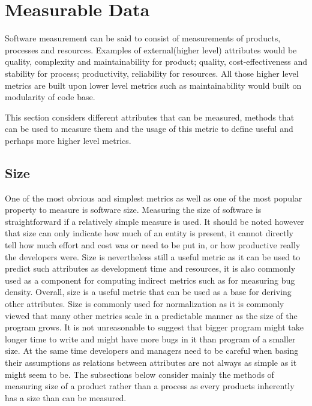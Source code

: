 \documentclass[11pt]{article}
\begin{document}
\section{Measurable Data}
\label{sec:Methods}
Software measurement can be said to consist of measurements of products, processes and resources.\cite{Fenton:2014:SMR:2700539} Examples of external(higher level) attributes would be quality, complexity and maintainability for product; quality, cost-effectiveness and stability for process; productivity, reliability for resources. All those higher level metrics are built upon lower level metrics such as maintainability would built on modularity of code base.

This section considers different attributes that can be measured, methods that can be used to measure them and the usage of this metric to define useful and perhaps more higher level metrics.

\subsection{Size}
One of the most obvious and simplest metrics as well as one of the most popular property to measure is software size. Measuring the size of software is straightforward if a relatively simple measure is used. It should be noted however that size can only indicate how much of an entity is present, it cannot directly tell how much effort and cost was or need to be put in, or how productive really the developers were. Size is nevertheless still a useful metric as it can be used to predict such attributes as development time and resources, it is also commonly used as a component for computing indirect metrics such as for measuring bug density.
Overall, size is a useful metric that can be used as a base for deriving other attributes. Size is commonly used for normalization as it is commonly viewed that many other metrics scale in a predictable manner as the size of the program grows. It is not unreasonable to suggest that bigger program might take longer time to write and might have more bugs in it than program of a smaller size. At the same time developers and managers need to be careful when basing their assumptions as relations between attributes are not always as simple as it might seem to be.
The subsections below consider mainly the methods of measuring size of a product rather than a process as every products inherently has a size than can be measured.
\end{document}
